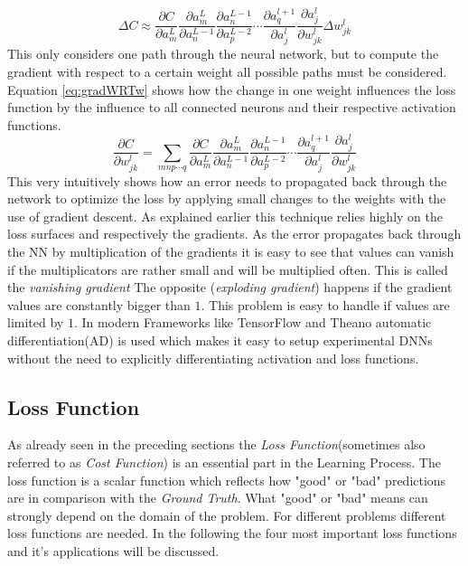 \begin{equation}\label{eq:deltaCfull}
\Delta C \approx \frac{\partial C}{\partial a^{L}_{m}} \frac{\partial a^{L}_{m}}{\partial a^{L-1}_{n}} \frac{\partial a^{L-1}_{n}}{\partial a^{L-2}_{p}} \cdots \frac{\partial a^{l+1}_{q}}{\partial a^{l}_{j}} \frac{\partial a^{l}_{j}}{\partial w^{l}_{jk}} \Delta  w^{l}_{jk}
\end{equation}
This only considers one path through the neural network, but to compute the gradient with respect to a certain weight all possible paths must be considered.
Equation \ref{eq:gradWRTw} shows how the change in one weight influences the loss function by the influence to all connected neurons and their respective activation functions.
\begin{equation}\label{eq:gradWRTw}
\frac{\partial C}{\partial w^{l}_{jk}} = \sum_{mnp \cdots q} \frac{\partial C}{\partial a^{L}_{m}} \frac{\partial a^{L}_{m}}{\partial a^{L-1}_{n}} \frac{\partial a^{L-1}_{n}}{\partial a^{L-2}_{p}} \cdots \frac{\partial a^{l+1}_{q}}{\partial a^{l}_{j}} \frac{\partial a^{l}_{j}}{\partial w^{l}_{jk}}
\end{equation}
This very intuitively shows how an error needs to propagated back through the network to optimize the loss by applying small changes to the weights with the use of gradient descent.
As explained earlier this technique relies highly on the loss surfaces and respectively the gradients. 
As the error propagates back through the NN by multiplication of the gradients it is easy to see that values can vanish if the multiplicators are rather small and will be multiplied often. 
This is called the \emph{vanishing gradient}
The opposite (\emph{exploding gradient}) happens if the gradient values are constantly bigger than $1$. 
This problem is easy to handle if values are limited by $1$.
In modern Frameworks like TensorFlow and Theano automatic differentiation(AD) is used which makes it easy to setup experimental DNNs without the need to explicitly differentiating activation and loss functions.\cite{ValdenegroToro2019DeepNN}


\subsection{Loss Function}\label{ssec:lossFunc}
As already seen in the preceding sections the \emph{Loss Function}(sometimes also referred to as \emph{Cost Function}) is an essential part in the Learning Process.
The loss function is a scalar function which reflects how "good" or "bad" predictions are in comparison with the \emph{Ground Truth}.
What "good" or "bad" means can strongly depend on the domain of the problem.
For different problems different loss functions are needed. 
In the following the four most important loss functions and it's applications will be discussed.
